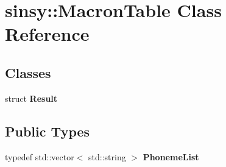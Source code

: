 \hypertarget{classsinsy_1_1MacronTable}{\section{sinsy\-:\-:\-Macron\-Table \-Class \-Reference}
\label{classsinsy_1_1MacronTable}
}
\subsection*{\-Classes}
\begin{DoxyCompactItemize}
\item 
struct {\bfseries \-Result}
\end{DoxyCompactItemize}
\subsection*{\-Public \-Types}
\begin{DoxyCompactItemize}
\item 
\hypertarget{classsinsy_1_1MacronTable_a393cc7c9bbcd3ed7fdb0df6a7971359f}{typedef std\-::vector$<$ std\-::string $>$ {\bfseries \-Phoneme\-List}}\label{classsinsy_1_1MacronTable_a393cc7c9bbcd3ed7fdb0df6a7971359f}

\end{DoxyCompactItemize}
